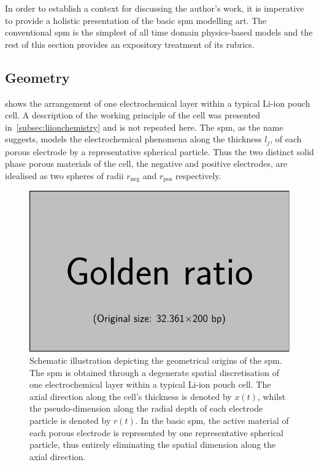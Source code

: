 
In  order  to establish  a  context  for discussing  the  author's  work, it  is
imperative to provide  a holistic presentation of the  basic \gls{spm} modelling
art. The conventional \gls{spm} is the simplest of all time domain physics-based
models and  the rest  of this  section provides an  expository treatment  of its
rubrics.

\subsection{Geometry}\label{subsec:basicspmgeometry}

  shows the  arrangement  of  one electrochemical  layer
within a  typical Li-ion pouch cell.  A description of the  working principle of
the cell was presented in~\cref{subsec:liionchemistry} and is not repeated here.
The \gls{spm}, as the name  suggests, models the electrochemical phenomena along
the thickness $l_j$,  \jinnegpos{} of each porous electrode  by a representative
spherical particle.  Thus the two distinct  solid phase porous materials  of the
cell, \ie{} the  negative and positive electrodes, are idealised  as two spheres
of radii $r_\text{neg}$ and $r_\text{pos}$ respectively.

\begin{figure}[!htbp]
    \centering
    \includegraphics{placeholder_images/example-image-golden.pdf}
    \caption[Schematic illustration depicting geometrical origins of the
    ]
    {Schematic illustration depicting the geometrical origins of the \gls{spm}.
        The \gls{spm} is obtained through a degenerate spatial discretisation of one
        electrochemical layer within a typical Li-ion pouch cell. The axial direction
        along the cell's thickness is denoted by $x(t)$, whilst the pseudo-dimension
        along the radial depth of each electrode particle is denoted by $r(t)$. In the
        basic \gls{spm}, the active material of each porous electrode is represented by
        one representative spherical particle, thus entirely eliminating the spatial
    dimension along the axial direction.}
    \label{fig:sandwichtospm}
\end{figure}

